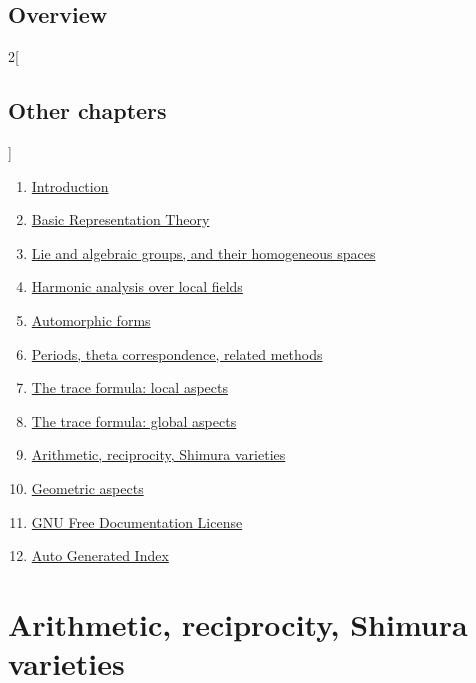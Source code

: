 \documentclass[oneside]{stacks-project-book}
\theoremstyle{plain}
\theoremstyle{definition}
\theoremstyle{remark}
\numberwithin{equation}{subsection}
\begin{document}
\section{Overview}
\label{traceformulaglobal-section-overview}
\hypertarget{0701}{}
\reversemarginpar{}




\begin{multicols}{2}[\section{Other chapters}]
\noindent
\begin{enumerate}
\item \hyperref[introduction-section-phantom]{Introduction}
\item \hyperref[representationtheory-section-phantom]{Basic Representation Theory}
\item \hyperref[algebraicgroups-section-phantom]{Lie and algebraic groups, and their homogeneous spaces}
\item \hyperref[harmonicanalysis-section-phantom]{Harmonic analysis over local fields}
\item \hyperref[automorphicforms-section-phantom]{Automorphic forms}
\item \hyperref[periods-section-phantom]{Periods, theta correspondence, related methods}
\item \hyperref[traceformulalocal-section-phantom]{The trace formula: local aspects}
\item \hyperref[traceformulaglobal-section-phantom]{The trace formula: global aspects}
\item \hyperref[arithmetic-section-phantom]{Arithmetic, reciprocity, Shimura varieties}
\item \hyperref[geometric-section-phantom]{Geometric aspects}
\item \hyperref[fdl-section-phantom]{GNU Free Documentation License}
\item \hyperref[index-section-phantom]{Auto Generated Index}
\end{enumerate}
\end{multicols}

%

\chapter{Arithmetic, reciprocity, Shimura varieties}
\end{document}
